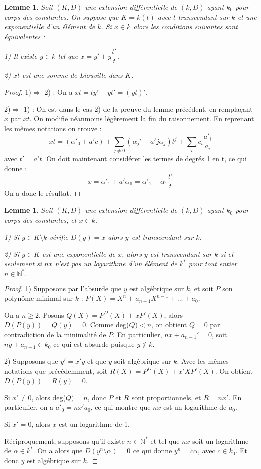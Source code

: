 \documentclass[12pt,a4paper]{report}
\newtheorem{lem}[thm]{\bf Lemme}
\begin{document}
\begin{lem}\rm
Soit $(K,D)$ une extension différentielle de $(k,D)$ ayant $k_{0}$ pour corps des constantes. On suppose que $K=k(t)$ avec $t$ transcendant sur $k$ et une exponentielle d'un élément de $k$. Si $x\in k$ alors les conditions suivantes sont équivalentes : 

1) Il existe $y\in k $ tel que $x=y'+y\dfrac{t'}{t}$.

2) $xt$ est une somme de Liouville dans $K$.
\end{lem}

\begin{proof}
1)$\Rightarrow $ 2) : On a $xt =ty'+yt'=(yt)'.$

2)$\Rightarrow $ 1) : On est dans le cas 2) de la preuve du lemme précédent, en remplaçant $x$ par $xt$. On modifie néanmoins légèrement la fin du raisonnement. En reprenant les mêmes notations on trouve : 
$$xt=(\alpha'_{0}+a'c) + \sum_{j\neq 0}(\alpha_{j}'+a'j\alpha_{j})t^{j}+\sum_{i}c_{i}\dfrac{a'_{i}}{a_{i}}$$
avec $t'=a't$. On doit maintenant considérer les termes de degrés 1 en t, ce qui donne : 
$$x=\alpha'_{1}+a'\alpha_{1}=\alpha'_{1}+\alpha_{1}\dfrac{t'}{t}$$
On a donc le résultat. 
\end{proof}

\begin{lem}\rm
Soit $(K,D)$ une extension différentielle de $(k,D)$ ayant $k_{0}$ pour corps des constantes, et $x\in k$. 

1) Si $y\in K\setminus k$ vérifie $D(y)=x$ alors $y$ est transcendant sur $k$.

2) Si $y\in K $ est une exponentielle de $x$, alors $y$ est transcendant sur $k$ si et seulement si $nx$ n'est pas un logarithme d'un élément de $k^{*}$ pour tout entier $n\in \mathbb{N}^{*}.$

\end{lem}


\begin{proof}
1) Supposons par l'absurde que $y$ est algébrique sur $k$, et soit $P$ son polynôme minimal sur $k$ : $P(X)=X^{n}+a_{n-1}X^{n-1}+...+a_{0}$. 

On a $n \geq 2$. Posons $Q(X)=P^{D}(X)+xP'(X)$, alors $D(P(y))=Q(y)=0.$ Comme deg($Q)<n$, on obtient $Q=0$ par contradiction de la minimalité de $P$. En particulier, $nx+a_{n-1}'=0$, soit $ny+a_{n-1} \in k_{0}$ ce qui est absurde  puisque $ y\notin k$. 

2) Supposons que $y'=x'y$ et que $y$ soit algébrique sur $k$. Avec les mêmes notations que précédemment, soit $R(X)=P^{D}(X)+x'XP'(X).$ On obtient $D(P(y))=R(y)=0$. 

Si $x'\neq 0$, alors deg($Q)=n$, donc $P$ et $R$ sont proportionnels, et $R=nx'.$ En particulier, on a $a'_{0}=nx'a_{0}$, ce qui montre que $nx$ est un logarithme de $a_{0}$. 

Si $x'=0$, alors $x$ est un logarithme de 1. 

Réciproquement, supposons qu'il existe $n\in \mathbb{N}^{*}$ et tel que $nx$ soit un logarithme de $\alpha \in k^{*}$. On a alors que $D(y^{n}\setminus \alpha)=0$ ce qui donne $y^{n}=c\alpha$, avec $c\in k_{0}$. Et donc $y$ est algébrique sur $k$. 

\end{proof}
\end{document}
